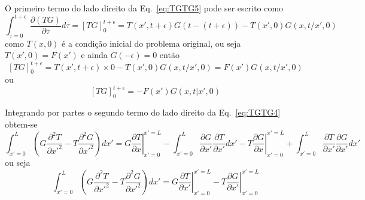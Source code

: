 O primeiro termo do lado direito da Eq.~\ref{eq:TGTG5} pode ser escrito como
\begin{equation}\label{eq:TG1}
    \int_{\tau=0}^{t+\epsilon} \frac{\partial(TG)}{\partial \tau} d\tau =
    [TG]_0^{t+\epsilon} = T(x',t+\epsilon) G(t-(t+\epsilon)) - T(x',0) G(x,t/x',0)
\end{equation}
como $T(x,0)$ é a condição inicial do problema original, ou seja $T(x',0)=F(x')$ e ainda	$G(-\epsilon)=0$ então
\begin{equation}\label{eq:xx2}
    [TG]_0^{t+\epsilon} = T(x',t+\epsilon) \times 0 - T(x',0) G(x,t/x',0) = F(x') G(x,t/x',0)				
\end{equation}
ou
\begin{equation}\label{eq:xx3}
    [TG]_0^{t+\epsilon} = - F(x') G(x,t|x',0)	
\end{equation}

Integrando por partes o segundo termo do lado direito da Eq.~\ref{eq:TGTG4} obtem-se
\begin{equation}\label{eq:TGTG51}
        \int_{x'=0}^{L} \left(G\frac{\partial ^2T}{\partial x'^2} -
        T \frac{\partial ^2G}{\partial x'^2}\right)dx' = 
        \left. G{\frac{\partial{T}}{\partial{x}}} \right|^{x'=L}_{x'=0} -\int_{x'=0}^{L}\frac{\partial G}{\partial x'} \frac{\partial T} {\partial x'} dx' - 
	\left. T{\frac{\partial{G}}{\partial{x}}}\right|^{x'=L}_{x'=0} +
        \int_{x'=0}^{L}\frac{\partial T}{\partial x'}\frac{\partial G}{\partial x'}dx'
\end{equation}
ou seja
\begin{equation}\label{eq:TGTG6}
    \int_{x'=0}^{L} 
    \left(G \frac{\partial ^2T} {\partial x'^2} - 
    T \frac{\partial ^2G} {\partial x'^2}\right)dx' = 
    G \left.{\frac{\partial{T}}{\partial{x'}}}\right|^{x'=L}_{x'=0} 
   -T \left.{\frac{\partial{G}}{\partial{x'}}}\right|^{x'=L}_{x'=0}
\end{equation}

